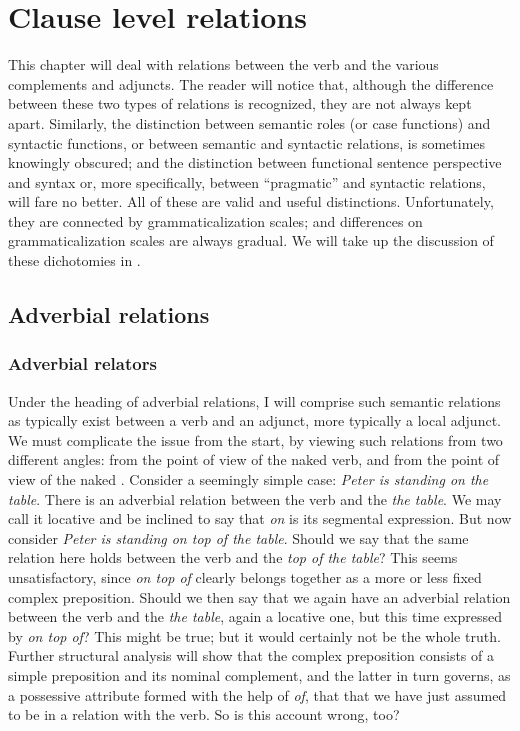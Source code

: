 \section{Clause level relations}\label{sec:3.4}

This chapter will deal with relations between the verb and the various complements and adjuncts. The reader will notice that, although the difference between these two types of relations is recognized, they are not always kept apart. Similarly, the distinction between semantic roles (or case functions) and syntactic functions, or between semantic and syntactic relations, is sometimes knowingly obscured; and the distinction between functional sentence perspective and syntax or, more specifically, between “pragmatic” and syntactic relations, will fare no better. All of these are valid and useful distinctions. Unfortunately, they are connected by grammaticalization scales; and differences on grammaticalization scales are always gradual. We will take up the discussion of these dichotomies in .

\subsection{Adverbial relations} \label{sec:3.4.1}
\subsubsection{Adverbial relators} \label{sec:3.4.1.1}


Under the heading of adverbial relations, I will comprise such semantic relations as typically exist between a verb and an adjunct, more typically a local adjunct. We must complicate the issue from the start, by viewing such relations from two different angles: from the point of view of the naked verb, and from the point of view of the naked \np. Consider a seemingly simple case: \textit{Peter is standing on the table}. There is an adverbial relation between the verb and the \np \textit{the table}. We may call it locative and be inclined to say that \textit{on} is its segmental expression. But now consider \textit{Peter is standing on top of the table}. Should we say that the same relation here holds between the verb and the \np \textit{top of the table}? This seems unsatisfactory, since \textit{on top of} clearly belongs together as a more or less fixed complex preposition. Should we then say that we again have an adverbial relation between the verb and the \np \textit{the table}, again a locative one, but this time expressed by \textit{on top of}? This might be true; but it would certainly not be the whole truth. Further structural analysis will show that the complex preposition consists of a simple preposition and its nominal complement, and the latter in turn governs, as a possessive attribute formed with the help of \textit{of}, that \np that we have just assumed to be in a relation with the verb. So is this account wrong, too?


